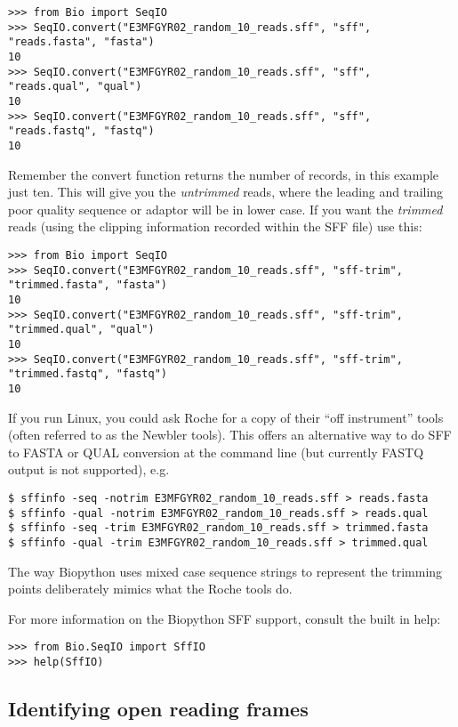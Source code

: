 \begin{verbatim}
>>> from Bio import SeqIO
>>> SeqIO.convert("E3MFGYR02_random_10_reads.sff", "sff", "reads.fasta", "fasta")
10
>>> SeqIO.convert("E3MFGYR02_random_10_reads.sff", "sff", "reads.qual", "qual")
10
>>> SeqIO.convert("E3MFGYR02_random_10_reads.sff", "sff", "reads.fastq", "fastq")
10
\end{verbatim}

\noindent Remember the convert function returns the number of records, in
this example just ten. This will give you the \emph{untrimmed} reads, where
the leading and trailing poor quality sequence or adaptor will be in lower
case. If you want the \emph{trimmed} reads (using the clipping information
recorded within the SFF file) use this:

\begin{verbatim}
>>> from Bio import SeqIO
>>> SeqIO.convert("E3MFGYR02_random_10_reads.sff", "sff-trim", "trimmed.fasta", "fasta")
10
>>> SeqIO.convert("E3MFGYR02_random_10_reads.sff", "sff-trim", "trimmed.qual", "qual")
10
>>> SeqIO.convert("E3MFGYR02_random_10_reads.sff", "sff-trim", "trimmed.fastq", "fastq")
10
\end{verbatim}

If you run Linux, you could ask Roche for a copy of their ``off instrument''
tools (often referred to as the Newbler tools). This offers an alternative way to
do SFF to FASTA or QUAL conversion at the command line (but currently FASTQ output
is not supported), e.g.

\begin{verbatim}
$ sffinfo -seq -notrim E3MFGYR02_random_10_reads.sff > reads.fasta
$ sffinfo -qual -notrim E3MFGYR02_random_10_reads.sff > reads.qual
$ sffinfo -seq -trim E3MFGYR02_random_10_reads.sff > trimmed.fasta
$ sffinfo -qual -trim E3MFGYR02_random_10_reads.sff > trimmed.qual
\end{verbatim}

\noindent The way Biopython uses mixed case sequence strings to represent
the trimming points deliberately mimics what the Roche tools do.

For more information on the Biopython SFF support, consult the built in help:

\begin{verbatim}
>>> from Bio.SeqIO import SffIO
>>> help(SffIO)
\end{verbatim}

\subsection{Identifying open reading frames}

